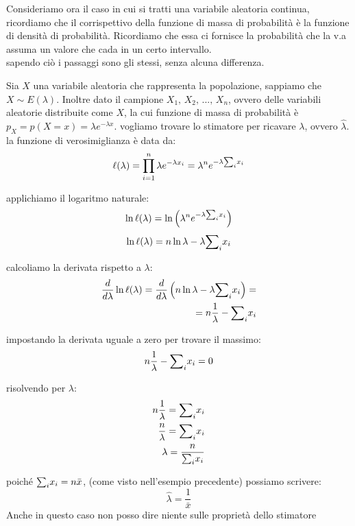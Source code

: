 Consideriamo ora il caso in cui si tratti una variabile aleatoria continua, ricordiamo che il corrispettivo della funzione di massa di probabilità è la funzione di densità di probabilità. Ricordiamo che essa ci fornisce la probabilità che la v.a assuma un valore che cada in un certo intervallo.
\\
sapendo ciò i passaggi sono gli stessi, senza alcuna differenza.
\begin{esempio}
Sia $X$ una variabile aleatoria che rappresenta la popolazione, sappiamo che $X\sim E(\lambda)$. Inoltre dato il campione $X_1,\, X_2,\, ...,\, X_n$, ovvero delle variabili aleatorie distribuite come $X$, la cui funzione di massa di probabilità è $p_X = p(X = x) = \lambda e^{-\lambda x}$.
vogliamo trovare lo stimatore per ricavare $\lambda$, ovvero $\hat{\lambda}$. \\


\noindent la funzione di verosimiglianza è data da:
\[
\ell(\lambda) = \prod_{i=1}^n \lambda e^{-\lambda x_i} = \lambda^n e^{-\lambda {\sum}_i x_i}
\]

\noindent applichiamo il logaritmo naturale:
\[
\ln \ell(\lambda) = \ln \left( \lambda^n e^{-\lambda {\sum}_i x_i} \right)
\]
\[
\ln \ell(\lambda) = n \ln \lambda - \lambda {\sum}_i x_i
\]

\noindent calcoliamo la derivata rispetto a \(\lambda\):
\begin{align*}
    \frac{d}{d\lambda} \ln \ell(\lambda) = \frac{d}{d\lambda} \left( n \ln \lambda - \lambda {\sum}_i x_i \right) = \\
    = n \frac{1}{\lambda} - {\sum}_i x_i
\end{align*}

\noindent impostando la derivata uguale a zero per trovare il massimo:
\[
n \frac{1}{\lambda} - {\sum}_i x_i = 0
\]

\noindent risolvendo per \(\lambda\):
\begin{align*}
    n \frac{1}{\lambda} = {\sum}_i x_i \\
    \frac{n}{\lambda} = {\sum}_i x_i \\
    \lambda = \frac{n}{{\sum}_i x_i}
\end{align*}

\noindent poiché \({\sum}_i x_i = n \bar{x}\),  (come visto nell'esempio precedente) possiamo scrivere:
\[
\hat{\lambda} = \frac{1}{\bar{x}}
\]
Anche in questo caso non posso dire niente sulle proprietà dello stimatore
\end{esempio}


